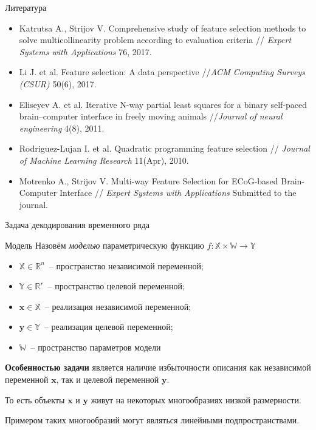 \documentclass[9pt]{beamer}
\newcommand{\bx}{\mathbf{x}}
\newcommand{\by}{\mathbf{y}}
\newcommand{\bbR}{\mathbb{R}}
\newcommand{\bbX}{\mathbb{X}}
\newcommand{\bbY}{\mathbb{Y}}
\begin{document}
\begin{frame}{Литература}
	\begin{itemize}
		\item Katrutsa A., Strijov V. Comprehensive study of feature selection methods to solve multicollinearity problem according to evaluation criteria // \textit{Expert Systems with Applications} 76, 2017.
		\vfill
		\item Li J. et al. Feature selection: A data perspective //\textit{ACM Computing Surveys (CSUR)} 50(6), 2017.
		\vfill
		\item Eliseyev A. et al. Iterative N-way partial least squares for a binary self-paced brain–computer interface in freely moving animals //\textit{Journal of neural engineering} 4(8), 2011.
		\vfill
		\item Rodriguez-Lujan I. et al. Quadratic programming feature selection // \textit{Journal of Machine Learning Research} 11(Apr), 2010.
		\vfill
		\item Motrenko A., Strijov V. Multi-way Feature Selection for ECoG-based Brain-Computer Interface // \textit{Expert Systems with Applications} Submitted to the journal.
	\end{itemize}
\end{frame}
\begin{frame}{Задача декодирования временного ряда}
	\begin{block}{Модель}
		Назовём \textit{моделью} параметрическую функцию $f: \bbX \times \mathbb{W} \rightarrow \bbY$
	\end{block}
	\begin{itemize}
		\item $\bbX \in \bbR^n$~-- пространство независимой переменной;
		\item $\bbY \in \bbR^r$~-- пространство целевой переменной;
		\item $\bx \in \bbX$~-- реализация независимой переменной;
		\item $\by \in \bbY$~-- реализация целевой переменной;
		\item $\mathbb{W}$~-- пространство параметров модели
	\end{itemize}
	\textbf{Особенностью задачи} является наличие избыточности описания как независимой переменной $\bx$, так и целевой переменной $\by$.
	
	То есть объекты $\bx$ и $\by$ живут на некоторых многообразиях низкой размерности. 
	
	Примером таких многообразий могут являться линейными подпространствами.
\end{frame}
\end{document}
